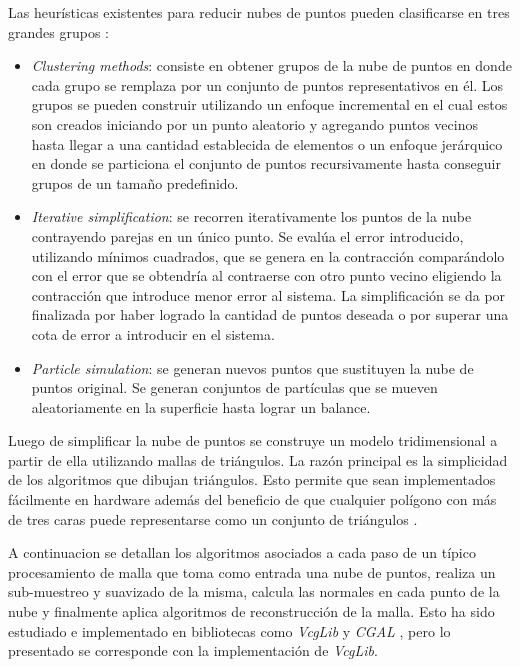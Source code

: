 Las heurísticas existentes para reducir nubes de puntos pueden clasificarse en tres grandes grupos \cite{PntCloud}:
\begin{itemize}
   \item \emph{Clustering methods}: consiste en obtener grupos de la nube de puntos en donde cada grupo se remplaza por un conjunto de puntos representativos en él. Los grupos se pueden construir utilizando un enfoque incremental en el cual estos son creados iniciando por un punto aleatorio y agregando puntos vecinos hasta llegar a una cantidad establecida de elementos o un enfoque jerárquico en donde se particiona el conjunto de puntos recursivamente hasta conseguir grupos de un tamaño predefinido.
   \item \emph{Iterative simplification}: se recorren iterativamente los puntos de la nube contrayendo parejas en un único punto. Se evalúa el error introducido, utilizando mínimos cuadrados, que se genera en la contracción comparándolo con el error que se obtendría al contraerse con otro punto vecino eligiendo la contracción que introduce menor error al sistema. La simplificación se da por finalizada por haber logrado la cantidad de puntos deseada o por superar una cota de error a introducir en el sistema.
   \item \emph{Particle simulation}: se generan nuevos puntos que sustituyen la nube de puntos original. Se generan conjuntos de partículas que se mueven aleatoriamente en la superficie hasta lograr un balance. %
\end{itemize}

Luego de simplificar la nube de puntos se construye un modelo tridimensional a partir de ella utilizando mallas de triángulos. La razón principal es la simplicidad de los algoritmos que dibujan triángulos. Esto permite que sean implementados fácilmente en hardware además del beneficio de que cualquier polígono con más de tres caras puede representarse como un conjunto de triángulos \cite{PCloudTriangle}.

A continuacion se detallan los algoritmos asociados a cada paso de un típico procesamiento de malla que toma como entrada una nube de puntos, realiza un sub-muestreo y suavizado de la misma, calcula las normales en cada punto de la nube y finalmente aplica algoritmos de reconstrucción de la malla. Esto ha sido estudiado e implementado en bibliotecas como \emph{VcgLib} \cite{VCGLib} y \emph{CGAL} \cite{CGAL}, pero lo presentado se corresponde con la implementación de \emph{VcgLib}. 

